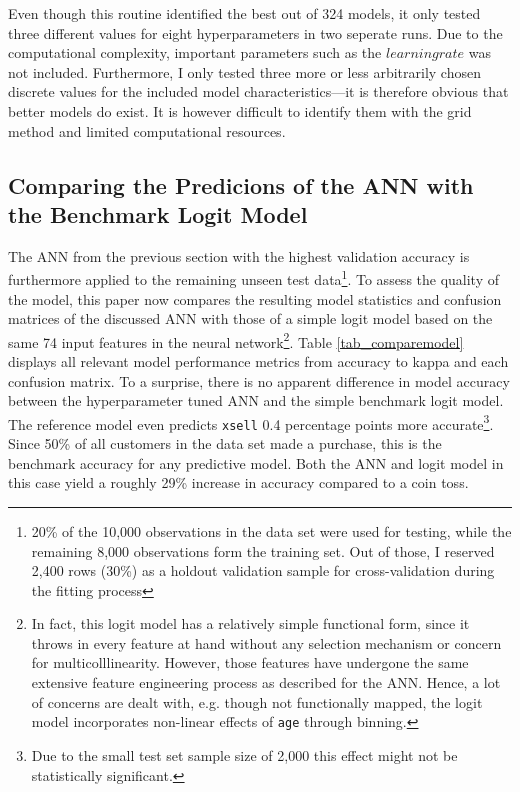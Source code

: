 \documentclass[12pt,a4paper]{article}
\let\code=\texttt
\begin{document}
Even though this routine identified the best out of 324 models, it only tested three different values for eight hyperparameters in two seperate runs.
Due to the computational complexity, important parameters such as the $learning rate$ was not included.
Furthermore, I only tested three more or less arbitrarily chosen discrete values for the included model characteristics---it is therefore obvious that
better models do exist. It is however difficult to identify them with the grid method and limited computational resources.

\subsection{Comparing the Predicions of the ANN with the Benchmark Logit Model}

The ANN from the previous section with the highest validation accuracy is furthermore applied to the remaining unseen test data\footnote{20\% 
of the 10,000 observations in the data set were used for testing, while the remaining 8,000 observations form the training set. Out of those, I reserved
2,400 rows (30\%) as a holdout validation sample for cross-validation during the fitting process}.
To assess the quality of the model, this paper now compares the resulting model statistics and confusion matrices of the discussed ANN with those of a 
simple logit model based on the same 74 input features in the neural network\footnote{In fact, this logit model has a relatively simple functional form, 
since it throws in every feature at hand without any selection mechanism or concern for multicolllinearity.
However, those features have undergone the same extensive feature engineering process as described for the ANN.
Hence, a lot of concerns are dealt with, e.g. though not functionally mapped, the logit model incorporates non-linear effects of \code{age} through binning.}.
Table \ref{tab_comparemodel} displays all relevant model performance metrics from accuracy to kappa and each confusion matrix.
To a surprise, there is no apparent difference in model accuracy between the hyperparameter tuned ANN and the simple benchmark logit model.
The reference model even predicts \code{xsell} 0.4 percentage points more accurate\footnote{Due to the small test set sample size of 2,000 this 
effect might not be statistically significant.}.
Since 50\% of all customers in the data set made a purchase, this is the benchmark accuracy for any predictive model.
Both the ANN and logit model in this case yield a roughly 29\% increase in accuracy compared to a coin toss.
\end{document}
